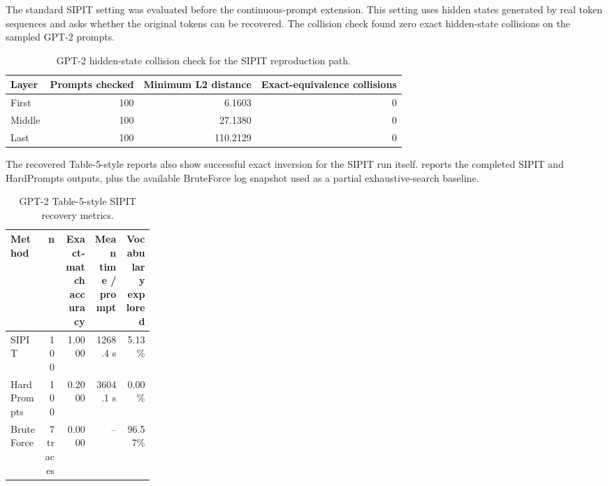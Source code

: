 \documentclass[12pt,a4paper,twoside,openright]{book}
\begin{document}
The standard SIPIT setting was evaluated before the continuous-prompt extension.
This setting uses hidden states generated by real token sequences and asks
whether the original tokens can be recovered. The collision check found zero
exact hidden-state collisions on the sampled GPT-2 prompts.

\begin{table}[!htb]
    \centering
    \scriptsize
    \begin{tabular}{l r r r}
        \toprule
        \textbf{Layer} & \textbf{Prompts checked} & \textbf{Minimum L2 distance} & \textbf{Exact-equivalence collisions} \\
        \midrule
        First & 100 & 6.1603 & 0 \\
        Middle & 100 & 27.1380 & 0 \\
        Last & 100 & 110.2129 & 0 \\
        \bottomrule
    \end{tabular}
    \caption{GPT-2 hidden-state collision check for the SIPIT reproduction path.}
    \label{tab:sipit-collision-check}
\end{table}

The recovered Table-5-style reports also show successful exact inversion for the
SIPIT run itself.  reports the completed
SIPIT and HardPrompts outputs, plus the available BruteForce log snapshot used as
a partial exhaustive-search baseline.

\begin{table}[!htb]
    \centering
    \scriptsize
    \begin{adjustbox}{width=\textwidth}
    \begin{tabular}{p{0.24\linewidth} r r r r}
        \toprule
        \textbf{Method} & \textbf{n} & \textbf{Exact-match accuracy} & \textbf{Mean time / prompt} & \textbf{Vocabulary explored} \\
        \midrule
        SIPIT & 100 & 1.0000 & 1268.4 s & 5.13\% \\
        HardPrompts & 100 & 0.2000 & 3604.1 s & 0.00\% \\
        BruteForce & 7 traces & 0.0000 & -- & 96.57\% \\
        \bottomrule
    \end{tabular}
    \end{adjustbox}
    \caption{GPT-2 Table-5-style SIPIT recovery metrics.}
    \label{tab:sipit-table5-recovery}
\end{table}
\end{document}
